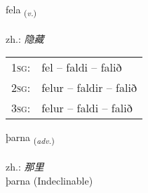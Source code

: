 \documentclass[frontgrid, backgrid]{flacards}\usepackage[]{graphicx}\usepackage[]{xcolor}
\begin{document}
\renewcommand{\flhead}{\vskip5pt \fboxsep=0pt {\small\bfseries\footnotesize Sagnorð | 动词}}
\renewcommand{\fcfoot}{\vskip5pt \fboxsep=0pt \hspace{2pt}{\small\bfseries\footnotesize 1K}}

\renewcommand{\blhead}{\vskip5pt {\small\bfseries\footnotesize Sagnorð | 动词 }}
\renewcommand{\bcfoot}{\vskip5pt \hspace{2pt}{\small\bfseries\footnotesize 1K}}


{fela \small{\textsubscript{(\textit{v.})}} \\[1ex] %
\textphonetic{[fɛːla]} \\
zh.: \emph{隐藏} \\  [2ex]
\renewcommand*{\arraystretch}{0.8}
\begin{tabular}{p{1cm}l}
\textsc{1sg}: & fel -- faldi -- falið \\ 
\textsc{2sg}: & felur -- faldir -- falið \\ 
\textsc{3sg}: & felur -- faldi -- falið \\ 
\end{tabular}
}


\renewcommand{\flhead}{\vskip5pt \fboxsep=0pt {\small\bfseries\footnotesize Atviksorð | 副词}}
\renewcommand{\fcfoot}{\vskip5pt \fboxsep=0pt \hspace{2pt}{\small\bfseries\footnotesize 1K}}

\renewcommand{\blhead}{\vskip5pt {\small\bfseries\footnotesize Atviksorð | 副词 }}
\renewcommand{\bcfoot}{\vskip5pt \hspace{2pt}{\small\bfseries\footnotesize 1K}}


{þarna \small{\textsubscript{(\textit{adv.})}} \\[1ex]
\textphonetic{[θartna]} \\
zh.: \emph{那里} \\  [2ex]
þarna (Indeclinable)}

\renewcommand{\flhead}{\vskip5pt \fboxsep=0pt {\small\bfseries\footnotesize Lýsingarorð | 形容词}}
\renewcommand{\fcfoot}{\vskip5pt \fboxsep=0pt \hspace{2pt}{\small\bfseries\footnotesize 1K}}
\end{document}
